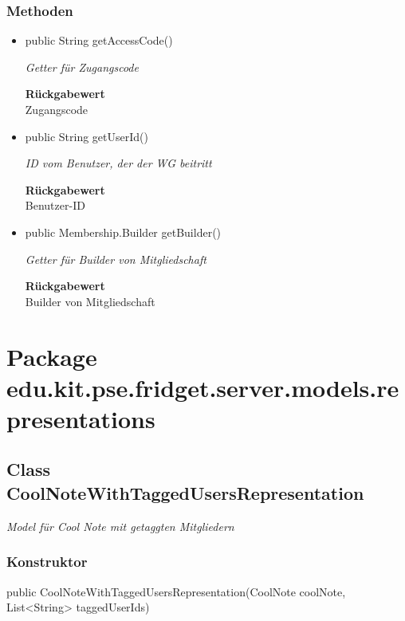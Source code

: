 \documentclass[a4paper]{scrreprt}
\begin{document}
        \subsubsection{Methoden}
        \begin{itemize}
        	\item{public String getAccessCode()}
        	
        	\textit{Getter für Zugangscode}
        	
        	
        	
        	\textbf{Rückgabewert} \\
        	Zugangscode        \item{public String getUserId()}
        	
        	\textit{ID vom Benutzer, der der WG beitritt}
        	
        	
        	
        	\textbf{Rückgabewert} \\
        	Benutzer-ID        \item{public Membership.Builder getBuilder()}
        	
        	\textit{Getter für Builder von Mitgliedschaft}
        	
        	
        	
        	\textbf{Rückgabewert} \\
        	Builder von Mitgliedschaft
        \end{itemize}
        \section{Package edu.kit.pse.fridget.server.models.representations}
        \subsection{Class CoolNoteWithTaggedUsersRepresentation}
        \textit{Model für Cool Note mit getaggten Mitgliedern}
        \subsubsection{Konstruktor}
        public CoolNoteWithTaggedUsersRepresentation(CoolNote coolNote, List<String> taggedUserIds)
\end{document}
